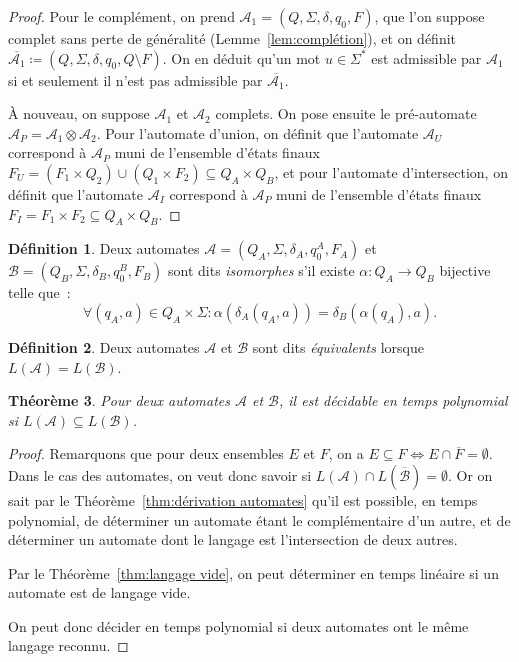 \documentclass{article}
\newtheorem{thm}{Théorème}[section]
\theoremstyle{definition}
\newtheorem{déf}[thm]{Définition}
\theoremstyle{remark}
\newcommand{\automaton}{(Q, \Sigma, \delta, q_0, F)}
\begin{document}
	\begin{proof} Pour le complément, on prend $\mathcal A_1 = \automaton$, que l'on suppose complet sans perte de généralité (Lemme~\ref{lem:complétion}), et
	on définit $\overline {\mathcal A_1} \coloneqq (Q, \Sigma, \delta, q_0, Q \setminus F)$. On en déduit qu'un mot $u \in \Sigma^*$ est admissible par $\mathcal A_1$
	si et seulement il n'est pas admissible par $\overline {\mathcal A_1}$.

	À nouveau, on suppose $\mathcal A_1$ et $\mathcal A_2$ complets. On pose ensuite le pré-automate $\mathcal A_P = \mathcal A_1 \otimes \mathcal A_2$. Pour
	l'automate d'union, on définit que l'automate $\mathcal A_U$ correspond à $\mathcal A_P$ muni de l'ensemble d'états finaux
	$F_U = (F_1 \times Q_2) \cup (Q_1 \times F_2) \subseteq Q_A \times Q_B$, et pour l'automate d'intersection, on définit que l'automate $\mathcal A_I$
	correspond à $\mathcal A_P$ muni de l'ensemble d'états finaux $F_I = F_1 \times F_2 \subseteq Q_A \times Q_B$.
	\end{proof}

	\begin{déf} Deux automates $\mathcal A = (Q_A, \Sigma, \delta_A, q_0^A, F_A)$ et $\mathcal B = (Q_B, \Sigma, \delta_B, q_0^B, F_B)$ sont dits \textit{isomorphes}
	s'il existe $\alpha : Q_A \to Q_B$ bijective telle que~:
	\[\forall (q_A, a) \in Q_A \times \Sigma : \alpha(\delta_A(q_A, a)) = \delta_B(\alpha(q_A), a).\]
	\end{déf}

	\begin{déf} Deux automates $\mathcal A$ et $\mathcal B$ sont dits \textit{équivalents} lorsque $L(\mathcal A) = L(\mathcal B)$.
	\end{déf}

	\begin{thm} Pour deux automates $\mathcal A$ et $\mathcal B$, il est décidable en temps polynomial si $L(\mathcal A) \subseteq L(\mathcal B)$.
	\end{thm}

	\begin{proof} Remarquons que pour deux ensembles $E$ et $F$, on a $E \subseteq F \iff E \cap \overline F = \emptyset$. Dans le cas des automates, on veut
	donc savoir si $L(\mathcal A) \cap L(\overline {\mathcal B}) = \emptyset$. Or on sait par le Théorème~\ref{thm:dérivation automates} qu'il est possible, en
	temps polynomial, de déterminer un automate étant le complémentaire d'un autre, et de déterminer un automate dont le langage est l'intersection de deux autres.

	Par le Théorème~\ref{thm:langage vide}, on peut déterminer en temps linéaire si un automate est de langage vide.

	On peut donc décider en temps polynomial si deux automates ont le même langage reconnu.
	\end{proof}
\end{document}
